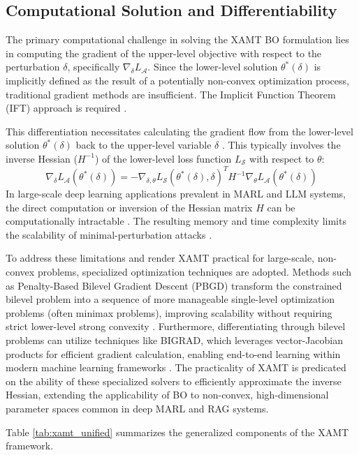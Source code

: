\documentclass[conference]{IEEEtran}
\begin{document}
\subsection{Computational Solution and Differentiability}
The primary computational challenge in solving the XAMT BO formulation lies in computing the gradient of the upper-level objective with respect to the perturbation $\delta$, specifically $\nabla_{\delta} L_{\mathcal{A}}$. Since the lower-level solution $\theta^*(\delta)$ is implicitly defined as the result of a potentially non-convex optimization process, traditional gradient methods are insufficient. The Implicit Function Theorem (IFT) approach is required \cite{Ref38}.

This differentiation necessitates calculating the gradient flow from the lower-level solution $\theta^*(\delta)$ back to the upper-level variable $\delta$ \cite{Ref38}. This typically involves the inverse Hessian ($H^{-1}$) of the lower-level loss function $L_{\mathcal{S}}$ with respect to $\theta$:
$$
\nabla_{\delta} L_{\mathcal{A}}(\theta^*(\delta)) = - \nabla_{\delta, \theta} L_{\mathcal{S}}(\theta^*(\delta), \delta)^T H^{-1} \nabla_{\theta} L_{\mathcal{A}}(\theta^*(\delta))
$$
In large-scale deep learning applications prevalent in MARL and LLM systems, the direct computation or inversion of the Hessian matrix $H$ can be computationally intractable \cite{Ref39}. The resulting memory and time complexity limits the scalability of minimal-perturbation attacks \cite{Ref39}.

To address these limitations and render XAMT practical for large-scale, non-convex problems, specialized optimization techniques are adopted. Methods such as Penalty-Based Bilevel Gradient Descent (PBGD) transform the constrained bilevel problem into a sequence of more manageable single-level optimization problems (often minimax problems), improving scalability without requiring strict lower-level strong convexity \cite{Ref21, Ref22}. Furthermore, differentiating through bilevel problems can utilize techniques like BIGRAD, which leverages vector-Jacobian products for efficient gradient calculation, enabling end-to-end learning within modern machine learning frameworks \cite{Ref23}. The practicality of XAMT is predicated on the ability of these specialized solvers to efficiently approximate the inverse Hessian, extending the applicability of BO to non-convex, high-dimensional parameter spaces common in deep MARL and RAG systems.

Table \ref{tab:xamt_unified} summarizes the generalized components of the XAMT framework.
\end{document}
